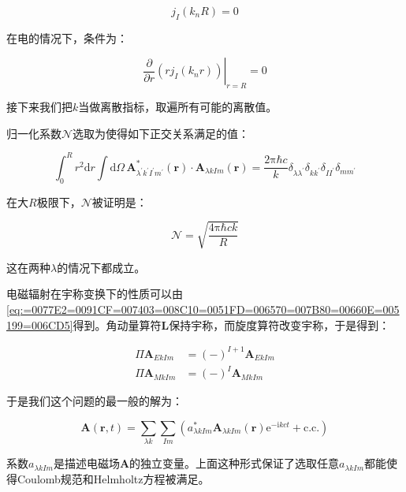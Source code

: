 \begin{equation}
j_{I}(k_{n}R)=0\label{eq:=0078C1=008FB9=00754C=006761=004EF6}
\end{equation}

在电的情况下，条件为：

\begin{equation}
\left.\frac{\partial}{\partial r}(rj_{I}(k_{n}r))\right|_{r=R}=0
\end{equation}

接下来我们把$k$当做离散指标，取遍所有可能的离散值。

归一化系数$\mathcal{N}$选取为使得如下正交关系满足的值：

\begin{equation}
\int^{R}_{0}r^{2}\mathrm{d}r\int\mathrm{d}\Omega\,\boldsymbol{A}^{*}_{\lambda^{\prime}k^{\prime}I^{\prime}m^{\prime}}(\boldsymbol{r})\cdot\boldsymbol{A}_{\lambda kIm}(\boldsymbol{r})=\frac{2\mathrm{\pi}\hbar c}{k}\delta_{\lambda\lambda^{\prime}}\delta_{kk^{\prime}}\delta_{II^{\prime}}\delta_{mm^{\prime}}
\end{equation}

在大$R$极限下，$\mathcal{N}$被证明是：

\begin{equation}
\mathcal{N}=\sqrt{\frac{4\mathrm{\pi}\hbar ck}{R}}
\end{equation}

这在两种$\lambda$的情况下都成立。

电磁辐射在宇称变换下的性质可以由\ref{eq:=0077E2=0091CF=007403=008C10=0051FD=006570=007B80=00660E=005199=006CD5}得到。角动量算符$\boldsymbol{L}$保持宇称，而旋度算符改变宇称，于是得到：

\begin{align}
\Pi\boldsymbol{A}_{EkIm} & =(-)^{I+1}\boldsymbol{A}_{EkIm}\nonumber \\
\Pi\boldsymbol{A}_{MkIm} & =(-)^{I}\boldsymbol{A}_{MkIm}\label{eq:=007535=0078C1=008F90=005C04=005728=005B87=0079F0=0053D8=006362=004E0B=006027=008D28}
\end{align}

于是我们这个问题的最一般的解为：

\begin{equation}
\boldsymbol{A}(\boldsymbol{r},t)=\sum_{\lambda k}\sum_{Im}\left(a^{*}_{\lambda kIm}\boldsymbol{A}_{\lambda kIm}(\boldsymbol{r})\mathrm{e}^{-\mathrm{i}kct}+\text{c.c.}\right)
\end{equation}

系数$a_{\lambda kIm}$是描述电磁场$\boldsymbol{A}$的独立变量。上面这种形式保证了选取任意$a_{\lambda kIm}$都能使得Coulomb规范和Helmholtz方程被满足。

